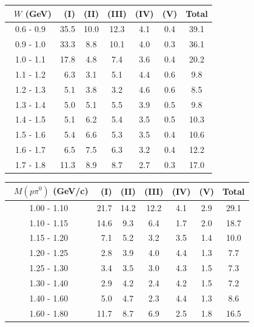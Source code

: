 \documentclass[aps, prd, reprint,showpacs,  preprintnumbers,amsmath,amssymb,superscriptaddress, nofootinbib]{revtex4-1}
\makeatletter
\renewenvironment{table}
  {\def\@captype{table}}
  {}
\makeatother
\begin{document}
\vspace{0.4cm}



\begin{table}
\centering
\begin{tabular}{crccccc}
\hline
~$W$ (GeV) & (I) & (II) & (III) & (IV) & (V) & Total \\
\hline
     0.6 - 0.9 & 35.5 & 10.0 & 12.3 &  4.1 &  0.4 & 39.1 \\
     0.9 - 1.0 & 33.3 &  8.8 & 10.1 &  4.0 &  0.3 & 36.1 \\
     1.0 - 1.1 & 17.8 &  4.8 &  7.4 &  3.6 &  0.4 & 20.2 \\
     1.1 - 1.2 &  6.3 &  3.1 &  5.1 &  4.4 &  0.6 &  9.8 \\
     1.2 - 1.3 &  5.1 &  3.8 &  3.2 &  4.6 &  0.6 &  8.5 \\
     1.3 - 1.4 &  5.0 &  5.1 &  5.5 &  3.9 &  0.5 &  9.8 \\
     1.4 - 1.5 &  5.1 &  6.2 &  5.4 &  3.5 &  0.5 & 10.3 \\
     1.5 - 1.6 &  5.4 &  6.6 &  5.3 &  3.5 &  0.4 & 10.6 \\
     1.6 - 1.7 &  6.5 &  7.5 &  6.3 &  3.2 &  0.4 & 12.2 \\
     1.7 - 1.8 & 11.3 &  8.9 &  8.7 &  2.7 &  0.3 & 17.0 \\
\hline
\hline
\end{tabular}
\caption{Fractional systematic uncertainties (in percent) for $d\sigma/W$.}
\label{tb:syst-W}
\end{table}

\vspace{0.5cm}

\begin{table}
\begin{tabular}{crccccc}
\hline
~$M(p\pi^{0})$ (GeV/c) & (I) & (II) & (III) & (IV) & (V) & Total \\           
\hline
   1.00 - 1.10 & 21.7 & 14.2 & 12.2 &  4.1 &  2.9 & 29.1 \\
   1.10 - 1.15 & 14.6 &  9.3 &  6.4 &  1.7 &  2.0 & 18.7 \\
   1.15 - 1.20 &  7.1 &  5.2 &  3.2 &  3.5 &  1.4 & 10.0 \\
   1.20 - 1.25 &  2.8 &  3.9 &  4.0 &  4.4 &  1.3 &  7.7 \\
   1.25 - 1.30 &  3.4 &  3.5 &  3.0 &  4.3 &  1.5 &  7.3 \\
   1.30 - 1.40 &  2.9 &  4.2 &  2.4 &  4.2 &  1.5 &  7.2 \\
   1.40 - 1.60 &  5.0 &  4.7 &  2.3 &  4.4 &  1.3 &  8.6 \\
   1.60 - 1.80 & 11.7 &  8.7 &  6.9 &  2.5 &  1.8 & 16.5 \\
\hline
\hline
\end{tabular}
\caption{Fractional systematic uncertainties (in percent) for $d\sigma/dM(p\pi^{0})$.\\
NOTE: Result is for the $p\pi^{0}$ subsample with $T_{p}>100$\,MeV and $W<1.8$\,GeV.}
\label{tb:syst-MppizW18}
\end{table}
\end{document}
